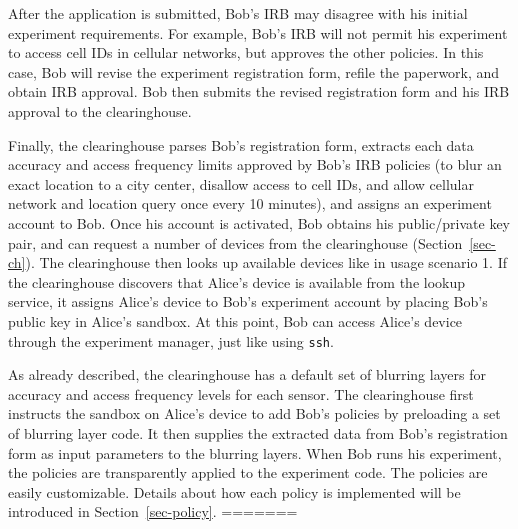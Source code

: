 {{After the application is submitted, Bob's IRB may disagree with 
his initial experiment requirements. For example, Bob's IRB will not permit
his experiment to access cell IDs in cellular networks, but 
approves the other policies. 
In this case, Bob will revise the experiment registration form, refile the paperwork, 
and obtain IRB approval. Bob then submits the revised  
registration form and his IRB approval to the clearinghouse.

Finally, the clearinghouse
parses Bob's registration form, extracts each data accuracy and access 
frequency limits approved by Bob's IRB policies (to blur an exact location 
to a city center, disallow access to cell IDs, and allow cellular network and 
location query once every 10 minutes), and assigns an experiment 
account to Bob. Once his account is activated, 
Bob obtains his public/private key pair, and can request a number of devices from the 
clearinghouse (Section~\ref{sec-ch}). The clearinghouse then looks up
available devices like in usage scenario 1. If the clearinghouse 
discovers that Alice's device is available from the lookup service, it
assigns Alice's device to Bob's experiment account by placing Bob's
public key in Alice's sandbox. At this point, Bob can access Alice's 
device through the experiment manager, just like using \texttt{ssh}.

As already described, the clearinghouse has a default set of blurring layers 
for accuracy and access frequency levels for each sensor. 
The clearinghouse first instructs 
the sandbox on Alice's device to add Bob's policies by preloading
a set of blurring layer code. It then supplies the extracted data from 
Bob's registration form as input parameters to the blurring layers. 
When Bob runs his experiment, the policies are transparently applied
to the experiment code. 
The policies are easily customizable. Details about
how each policy is implemented will be introduced in Section~\ref{sec-policy}.
=======



}}
